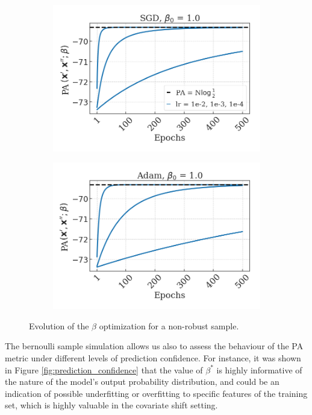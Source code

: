 \begin{figure}[H]
    \centering
    \begin{subfigure}[b]{0.45\textwidth}
        \centering
        \includegraphics[width=\textwidth]{img/results_discussion/empirical/nonrob_met=logPA_hue=lr_opt=sgd_beta0=1.0.png}
    \end{subfigure}
    \hfill
    \begin{subfigure}[b]{0.45\textwidth}
        \centering
        \includegraphics[width=\textwidth]{img/results_discussion/empirical/nonrob_met=logPA_hue=lr_opt=adam_beta0=1.0.png}
    \end{subfigure}
    \caption{Evolution of the $\beta$ optimization for a non-robust sample.}
\end{figure}

The bernoulli sample simulation allows us also to assess the behaviour of the PA
metric under different levels of prediction confidence. For instance, it was shown in
Figure \ref{fig:prediction_confidence} that the value of $\beta^{*}$ is highly informative
of the nature of the model's output probability distribution, and could be an indication of
possible underfitting or overfitting to specific features of the training set, which is highly
valuable in the covariate shift setting.

